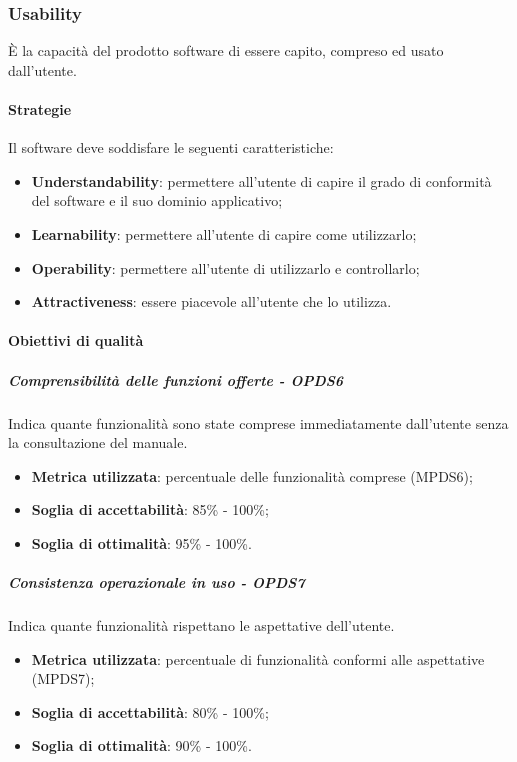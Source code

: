 \documentclass[PianoDiQualifica.tex]{subfiles}
\begin{document}
		\subsubsection{Usability}
		È la capacità del prodotto software di essere capito, compreso ed usato dall'utente.
		
			\paragraph{Strategie}
			Il software deve soddisfare le seguenti caratteristiche:
			\begin{itemize}
				\item \textbf{Understandability}: permettere all'utente di capire il grado di conformità del software e il suo dominio applicativo;
				\item \textbf{Learnability}: permettere all'utente di capire come utilizzarlo;
				\item \textbf{Operability}: permettere all'utente di utilizzarlo e controllarlo;
				\item \textbf{Attractiveness}: essere piacevole all'utente che lo utilizza.
			\end{itemize}
			
			\paragraph{Obiettivi di qualità}
			
				\subparagraph{Comprensibilità delle funzioni offerte - OPDS6}
				Indica quante funzionalità sono state comprese immediatamente dall'utente senza la consultazione del manuale.
				\begin{itemize}
					\item \textbf{Metrica utilizzata}: percentuale delle funzionalità comprese (MPDS6);
					\item \textbf{Soglia di accettabilità}: 85\% - 100\%;
					\item \textbf{Soglia di ottimalità}: 95\% - 100\%.
				\end{itemize}
			
				\subparagraph{Consistenza operazionale in uso - OPDS7}
				Indica quante funzionalità rispettano le aspettative dell'utente.
				\begin{itemize}
					\item \textbf{Metrica utilizzata}: percentuale di funzionalità conformi alle aspettative (MPDS7);
					\item \textbf{Soglia di accettabilità}: 80\% - 100\%;
					\item \textbf{Soglia di ottimalità}: 90\% - 100\%.
				\end{itemize}
		
\end{document}
